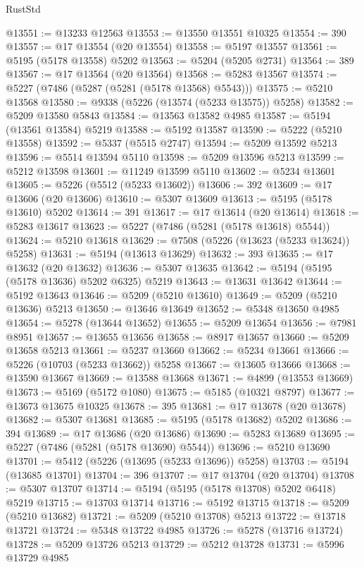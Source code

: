 \begin{lexlean}{RustStd}
\begin{coremodule}
@13551 := @13233 @12563
@13553 := @13550 @13551 @10325
@13554 := 390
@13557 := @17 @13554 (@20 @13554)
@13558 := @5197 @13557
@13561 := @5195 (@5178 @13558) @5202
@13563 := @5204 (@5205 @2731)
@13564 := 389
@13567 := @17 @13564 (@20 @13564)
@13568 := @5283 @13567
@13574 := @5227 (@7486 (@5287 (@5281 (@5178 @13568) @5543)))
@13575 := @5210 @13568
@13580 := @9338 (@5226 (@13574 (@5233 @13575)) @5258)
@13582 := @5209 @13580 @5843
@13584 := @13563 @13582 @4985
@13587 := @5194 (@13561 @13584) @5219
@13588 := @5192 @13587
@13590 := @5222 (@5210 @13558)
@13592 := @5337 (@5515 @2747)
@13594 := @5209 @13592 @5213
@13596 := @5514 @13594 @5110
@13598 := @5209 @13596 @5213
@13599 := @5212 @13598
@13601 := @11249 @13599 @5110
@13602 := @5234 @13601
@13605 := @5226 (@5512 (@5233 @13602))
@13606 := 392
@13609 := @17 @13606 (@20 @13606)
@13610 := @5307 @13609
@13613 := @5195 (@5178 @13610) @5202
@13614 := 391
@13617 := @17 @13614 (@20 @13614)
@13618 := @5283 @13617
@13623 := @5227 (@7486 (@5281 (@5178 @13618) @5544))
@13624 := @5210 @13618
@13629 := @7508 (@5226 (@13623 (@5233 @13624)) @5258)
@13631 := @5194 (@13613 @13629)
@13632 := 393
@13635 := @17 @13632 (@20 @13632)
@13636 := @5307 @13635
@13642 := @5194 (@5195 (@5178 @13636) @5202 @6325) @5219
@13643 := @13631 @13642
@13644 := @5192 @13643
@13646 := @5209 (@5210 @13610)
@13649 := @5209 (@5210 @13636) @5213
@13650 := @13646 @13649
@13652 := @5348 @13650 @4985
@13654 := @5278 (@13644 @13652)
@13655 := @5209 @13654
@13656 := @7981 @8951
@13657 := @13655 @13656
@13658 := @8917 @13657
@13660 := @5209 @13658 @5213
@13661 := @5237 @13660
@13662 := @5234 @13661
@13666 := @5226 (@10703 (@5233 @13662)) @5258
@13667 := @13605 @13666
@13668 := @13590 @13667
@13669 := @13588 @13668
@13671 := @4899 (@13553 @13669)
@13673 := @5169 (@5172 @1080)
@13675 := @5185 (@10321 @8797)
@13677 := @13673 @13675 @10325
@13678 := 395
@13681 := @17 @13678 (@20 @13678)
@13682 := @5307 @13681
@13685 := @5195 (@5178 @13682) @5202
@13686 := 394
@13689 := @17 @13686 (@20 @13686)
@13690 := @5283 @13689
@13695 := @5227 (@7486 (@5281 (@5178 @13690) @5544))
@13696 := @5210 @13690
@13701 := @5412 (@5226 (@13695 (@5233 @13696)) @5258)
@13703 := @5194 (@13685 @13701)
@13704 := 396
@13707 := @17 @13704 (@20 @13704)
@13708 := @5307 @13707
@13714 := @5194 (@5195 (@5178 @13708) @5202 @6418) @5219
@13715 := @13703 @13714
@13716 := @5192 @13715
@13718 := @5209 (@5210 @13682)
@13721 := @5209 (@5210 @13708) @5213
@13722 := @13718 @13721
@13724 := @5348 @13722 @4985
@13726 := @5278 (@13716 @13724)
@13728 := @5209 @13726 @5213
@13729 := @5212 @13728
@13731 := @5996 @13729 @4985

\end{coremodule}
\end{lexlean}
